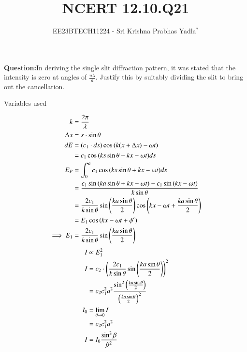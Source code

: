 \documentclass[journal,12pt,twocolumn]{IEEEtran}
\theoremstyle{remark}
\begin{document}

\vspace{3cm}

\title{NCERT 12.10.Q21}
\author{EE23BTECH11224 - Sri Krishna Prabhas Yadla$^{*}$%
}
\maketitle
\newpage
\bigskip

\renewcommand{\thefigure}{\arabic{figure}}
\renewcommand{\thetable}{\arabic{table}}


\vspace{3cm}
\textbf{Question:}In deriving the single slit diffraction pattern, it was stated that the intensity is zero at angles of $\frac{n\lambda}{a}$. Justify this by suitably dividing the slit to bring out the cancellation.
\\
\solution
\begin{table}[htbp]
\centering
\def\arraystrech{1.5}

\caption{Variables used}
\label{tab:1.12_10_Q21}
\end{table}
\begin{align}
    k &= \frac{2\pi}{\lambda} \\
\Delta x &= s\cdot \sin{\theta}\\
    dE &= (c_1\cdot ds)\cos{(k(x+\Delta x)-\omega t)} \\
    &= c_1 \cos{(ks\sin{\theta} + kx-\omega t)} ds \\
    E_P &= \int_{0}^{a} c_1\cos{(ks\sin{\theta} + kx-\omega t)} ds \\
    &= \frac{c_1 \sin{(ka\sin{\theta} + kx-\omega t)}-c_1\sin{(kx-\omega t)}}{k\sin{\theta}} \\
    &= \frac{2c_1}{k\sin{\theta}}\sin{ \ensuremath{\left(\frac{ka\sin{\theta}}{2}\right)}}\cos{\ensuremath{\left(kx-\omega t+ \frac{ka\sin{\theta}}{2}\right)}} \\
    &= E_1 \cos{(kx-\omega t+ \phi')} \\
    \implies E_1 &= \frac{2c_1}{k\sin{\theta}}\sin{ \ensuremath{\left(\frac{ka\sin{\theta}}{2}\right)}}
\end{align}
\begin{align}
    I &\propto E_1^2  \\
    I &= c_2 \cdot \left(\frac{2c_1}{k\sin{\theta}}\sin{ \ensuremath{\left( \frac{ka\sin{\theta}}{2}\right)}}\right)^2 \\
    &= c_2c_1^2a^2 \frac{\sin^2{\left(\frac{ka\sin{\theta}}{2}\right)}}{\left(\frac{ka\sin{\theta}}{2}\right)^2} \label{eq:beta}\\
    I_0 &= \lim_{\theta\to 0} I\\
        &= c_2c_1^2a^2   \\
    I &= I_0 \frac{\sin^2{\beta}}{\beta^2}
\end{align}
\end{document}
